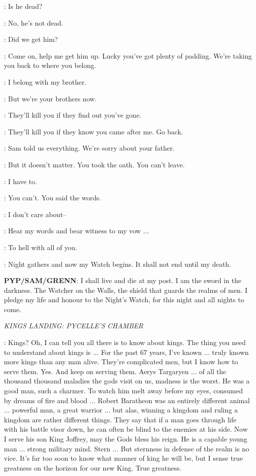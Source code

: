 \GRENN: Is he dead? 

\PYP: No, he's not dead. 

\SAM: Did we get him? 

\PYP: Come on, help me get him up. Lucky you've got plenty of padding.  We're taking you back to where you belong. 

\JON: I belong with my brother. 

\SAM: But we're your brothers now. 

\GRENN: They'll kill you if they find out you've gone. 

\JON: They'll kill you if they know you came after me. Go back. 

\PYP: Sam told us everything. We're sorry about your father. 

\GRENN: But it doesn't matter. You took the oath. You can't leave. 

\JON: I have to. 

\GRENN: You can't. You said the words. 

\JON: I don't care about--

\SAM: Hear my words and bear witness to my vow $\ldots$ 

\JON: To hell with all of you. 

\PYP: Night gathers and now my Watch begins. It shall not end until my death. 

\textbf{PYP/SAM/GRENN}: I shall live and die at my post. I am the sword in the darkness. The Watcher on the Walls, the shield that guards the realms of men. I pledge my life and honour to the Night's Watch, for this night and all nights to come. 


\scene

\textit{KINGS LANDING: PYCELLE'S CHAMBER}


\PYCELLE: Kings? Oh, I can tell you all there is to know about kings. The thing you need to understand about kings is $\ldots$ For the past 67 years, I've known $\ldots$ truly known more kings than any man alive. They're complicated men, but I know how to serve them. Yes. And keep on serving them. Aerys Targaryen $\ldots$ of all the thousand thousand maladies the gods visit on us, madness is the worst. He was a good man, such a charmer. To watch him melt away before my eyes, consumed by dreams of fire and blood $\ldots$ Robert Baratheon was an entirely different animal $\ldots$ powerful man, a great warrior $\ldots$ but alas, winning a kingdom and ruling a kingdom are rather different things. They say that if a man goes through life with his battle visor down, he can often be blind to the enemies at his side. Now I serve his son King Joffrey, may the Gods bless his reign. He is a capable young man $\ldots$ strong military mind. Stern $\ldots$ But sternness in defense of the realm is no vice. It's far too soon to know what manner of king he will be, but I sense true greatness on the horizon for our new King. True greatness. 

